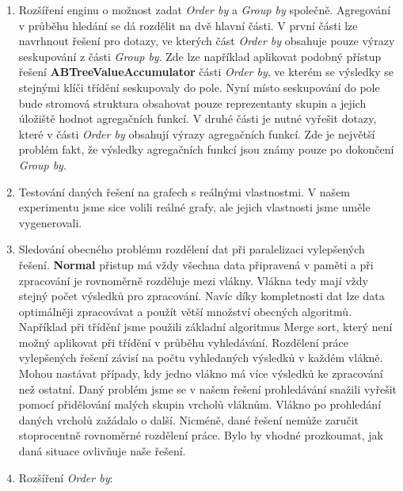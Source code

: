 \begin{enumerate}

\item 
Rozšíření enginu o možnost zadat \textit{Order by} a \textit{Group by} společně.
Agregování v průběhu hledání se dá rozdělit na dvě hlavní části.
V první části lze navrhnout řešení pro dotazy, ve kterých část \textit{Order by} obsahuje pouze výrazy seskupování z části \textit{Group by}.
Zde lze například aplikovat podobný přístup řešení \textbf{ABTreeValueAccumulator} části \textit{Order by}, ve kterém se výsledky se stejnými klíči třídění seskupovaly do pole.
Nyní místo seskupování do pole bude stromová struktura obsahovat pouze reprezentanty skupin a jejich úložiště hodnot agregačních funkcí.
V druhé části je nutné vyřešit dotazy, které v části \textit{Order by} obsahují výrazy agregačních funkcí.
Zde je největší problém fakt, že výsledky agregačních funkcí jsou známy pouze po dokončení \textit{Group by}.

\item Testování daných řešení na grafech s reálnými vlastnostmi.
V našem experimentu jsme sice volili reálné grafy, ale jejich vlastnosti jsme uměle vygenerovali.

\item Sledování obecného problému rozdělení dat při paralelizaci vylepšených řešení. 
\textbf{Normal} přistup má vždy všechna data připravená v paměti a při zpracování je rovnoměrně rozděluje mezi vlákny.
Vlákna tedy mají vždy stejný počet výsledků pro zpracování.
Navíc díky kompletnosti dat lze data optimálněji zpracovávat a použít větší množství obecných algoritmů.
Například při třídění jsme použili základní algoritmus Merge sort, který není možný aplikovat při třídění v průběhu vyhledávání.  
Rozdělení práce vylepšených řešení závisí na počtu vyhledaných výsledků v každém vlákně.
Mohou nastávat případy, kdy jedno vlákno má více výsledků ke zpracování než ostatní. 
Daný problém jsme se v našem řešení prohledávání snažili vyřešit pomocí přidělování malých skupin vrcholů vláknům.
Vlákno po prohledání daných vrcholů zažádalo o další.
Nicméně, dané řešení nemůže zaručit stoprocentně rovnoměrné rozdělení práce.
Bylo by vhodné prozkoumat, jak daná situace ovlivňuje naše řešení.

\item Rozšíření \textit{Order by}:
\begin{enumerate}


\end{enumerate}
\end{enumerate}

